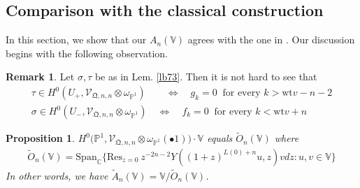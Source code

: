 \documentclass[11pt,b5paper,notitlepage]{article}
\theoremstyle{definition}
\newtheorem{rem}[df]{Remark}
\theoremstyle{plain}
\newtheorem{pp}[df]{Proposition}
\newcommand{\wtd}{\widetilde}
\newcommand{\Res}{\mathrm{Res}}
\newcommand{\Span}{\mathrm{Span}}
\newcommand{\scr}{\mathscr}
\newcommand{\blt}{\bullet}
\newcommand{\Vbb}{\mathbb V}
\newcommand{\Cbb}{\mathbb C}
\newcommand{\Pbb}{\mathbb P}
\newcommand{\wt}{\mathrm{wt}}
\newcommand{\<}{\left\langle}
\renewcommand{\>}{\right\rangle}
\newcommand{\fq}{{\mathfrak Q}}
\numberwithin{equation}{subsection}
\begin{document}
 








\subsection{Comparison with the classical construction}\label{lb74}




In this section, we show that our $A_n(\Vbb)$ agrees with the one in \cite{DLM-Zhu}. Our discussion begins with the following observation.

\begin{rem}\label{lb75}
Let $\sigma,\tau$ be as in Lem. \ref{lb73}. Then it is not hard to see that
\begin{subequations}
\begin{gather}
\tau\in H^0(U_+,\scr V_{\fq,n,n}\otimes\omega_{\Pbb^1})\quad\quad\Longleftrightarrow\quad g_k=0 ~\text{ for every } k>\wt v-n-2\\
\sigma\in H^0(U_-,\scr V_{\fq,n,n}\otimes\omega_{\Pbb^1})\quad\Longleftrightarrow\quad f_k=0~\text{ for every } k<\wt v+n
\end{gather}
\end{subequations}
\end{rem}

\begin{pp}
$H^0\big(\Pbb^1,\scr V_{\fq,n,n}\otimes\omega_{\Pbb^1}(\blt 1)\big)\cdot\Vbb$ equals $\wtd O_n(\Vbb)$ where
\begin{align}
\wtd O_n(\Vbb)=\Span_\Cbb\big\{\Res_{z=0}~z^{-2n-2}Y((1+z)^{L(0)+n}u,z)vdz:u,v\in\Vbb  \big\}
\end{align}
In other words, we have $\wtd A_n(\Vbb)=\Vbb/\wtd O_n(\Vbb)$.
\end{pp}
\end{document}
